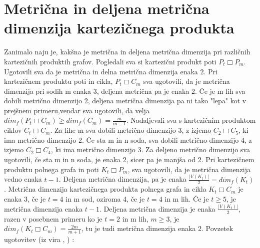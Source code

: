 \documentclass[a4paper]{report}
\begin{document}
	\section*{Metrična in deljena metrična dimenzija kartezičnega produkta}
	
	Zanimalo naju je, kakšna je metrična in deljena metrična dimenzija pri različnih kartezičnih produktih grafov. Pogledali sva si kartezični produkt poti $P_{t}\Box P_{m}$. Ugotovili sva da je metrična in delna metrična dimenzija enaka 2. Pri kartezičnem produktu poti in cikla, $P_{t}\Box C_{m}$ sva ugotovili, da je metrična dimenzija pri sodih m enaka 3, deljena metrična pa je enaka 2. Če je m lih sva dobili metrično dimenzijo 2, deljena metrična dimenzija pa ni tako "lepa" kot v prejšnem primeru,vendar sva ugotovili, da velja  $dim_{f}( P_{t}\Box C_{m})\ge dim_{f}(C_{m})= \frac{m}{m-1}$.
	Nadaljevali sva s kartezičnim produktom ciklov $C_{t}\Box C_{m}$. 
	Za lihe m sva dobili metrično dimenzijo 3, z izjemo $C_{2}\Box C_{5}$, ki ima metrično dimenzijo 2. Če sta m in n soda, sva dobili metrično dimenzijo 4, z izjemo $C_{2}\Box C_{4}$, ki ima metrično dimenzijo 3. Za deljeno metrično dimenzijo sva ugotovili, če sta m in n soda, je enaka 2, sicer pa je manjša od 2. Pri kartezičnem produktu polnega grafa in poti $K_{t}\Box P_{m}$, sva ugotovili, da je metrična dimenzija vedno enaka $t-1$. Deljena metrična dimenzija, pa je enaka $\frac{|V(K_{t})|}{2} = dim_{f}(K_{t})$. Metrična dimenzija kartezičnega produkta polnega grafa in cikla $K_{t}\Box C_{m}$ je enaka 3, če je $t = 4$ in m sod, oziroma 4, če je $t = 4$ in m lih. Če je $t \ge 5$, je metrična dimenzija enaka $t-1$. Deljena metrična dimenzija je enaka $\frac{|V(K_{t})|}{2}$, razen v posebnem primeru ko je $t = 2$ in m lih, $m \ge 3 $, je $dim_f(K_{t}\Box C_{m}) = \frac{2m}{m+1}$, tu je tudi metrična dimenzija enaka 2.
	Povzetek ugotovitev (iz vira \cite{4}, \cite{5}) : 
	\\
\end{document}
